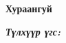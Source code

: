 

\begin{center}
{\scshape\Large \univname\par} %
{\scshape\large \facname\par}\vspace{0.5cm} %
{\huge\textbf{{Хураангуй}} \par}
\bigskip
{\Large{\ttitle} \par} %
\bigskip

{\normalsize \shortname \par} %
\addressname
\end{center}

\textit{\textbf{Түлхүүр үгс: \keywordnames}}
\bigskip




